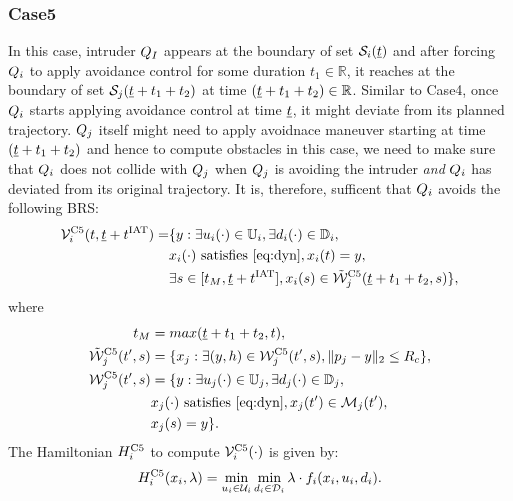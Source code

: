 \subsubsection{Case5} \label{sec:intruderObs_case5}
In this case, intruder $Q_{I}$ appears at the boundary of set $\mathcal{S}_i(\underline{t})$ and after forcing $Q_i$ to apply avoidance control for some duration $t_1 \in \mathbb{R}$, it reaches at the boundary of set $\mathcal{S}_j(\underline{t} + t_1 + t_2)$ at time $(\underline{t} + t_1 + t_2) \in \mathbb{R}$. Similar to Case4, once $Q_i$ starts applying avoidance control at time $\underline{t}$, it might deviate from its planned trajectory. $Q_j$ itself might need to apply avoidnace maneuver starting at time $(\underline{t} + t_1 + t_2)$ and hence to compute obstacles in this case, we need to make sure that $Q_i$ does not collide with $Q_j$ when $Q_j$ is avoiding the intruder \textit{and} $Q_i$ has deviated from its original trajectory. It is, therefore, sufficent that $Q_i$ avoids the following BRS:
\begin{equation}  \label{eq:ObsBRS_case5}
\begin{aligned}
\brs^{\text{C5}}_{i}(t, \tsa + \iat) = & \{y: \exists \ctrl_i(\cdot) \in \cfset_i, \exists \dstb_i(\cdot) \in \dfset_i, \\
& \state_i(\cdot) \text{ satisfies \eqref{eq:dyn}}, \state_i(t) = y, \\
& \exists s \in [t_M, \tsa + \iat], \state_i(s) \in \tilde{\frs}_j^{\text{C5}}(\tsa+t_1+t_2, s)\},
\end{aligned}
\end{equation}
where
\begin{equation} \label{eq:ObsAltSet_case5}
\begin{aligned}
t_M & = max(\tsa+t_1+t_2, t),\\
\tilde{\frs}_{j}^{\text{C5}}(t', s) & = \{\state_j: \exists (y, h) \in \frs_j^{\text{C5}}(t', s), \|\pos_j - y\|_2 \le \rc \},\\
\frs_j^{\text{C5}}(t', s) & = \{y: \exists \ctrl_j(\cdot) \in \cfset_j, \exists \dstb_j(\cdot) \in \dfset_j, \\
& \state_j(\cdot) \text{ satisfies \eqref{eq:dyn}}, \state_j(t') \in \boset_j(t'), \\
& \state_j(s) = y\}.
\end{aligned}
\end{equation} 
The Hamiltonian $H^{\text{C5}}_{i}$ to compute $\mathcal{V}^{\text{C5}}_{i}(\cdot)$ is given by:
\begin{equation} \label{eqn:BRS_obsham}
\ham^{\text{C5}}_{i}(\state_i, \costate) = \min_{\ctrl_i \in \cset_i} \min_{\dstb_i \in \dset_i} \costate \cdot f_i (\state_i, \ctrl_i, \dstb_i).
\end{equation}   

